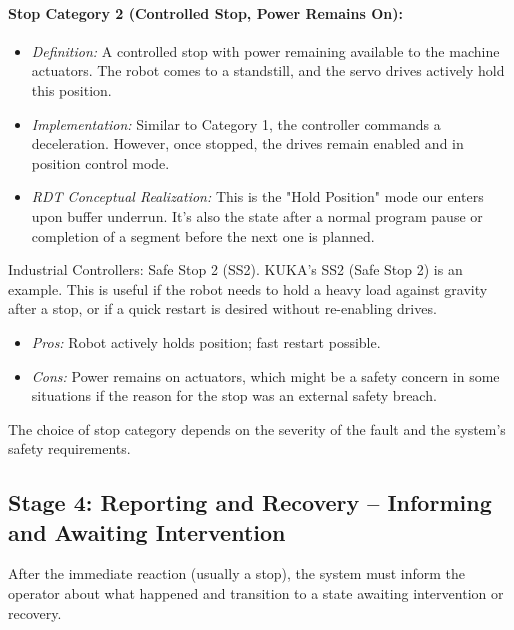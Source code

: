 \paragraph{Stop Category 2 (Controlled Stop, Power Remains On):}
        \begin{itemize}
            \item \textit{Definition:} A controlled stop with power remaining available to the machine actuators. The robot comes to a standstill, and the servo drives actively hold this position.
            \item \textit{Implementation:} Similar to Category 1, the controller commands a deceleration. However, once stopped, the drives remain enabled and in position control mode.
            \item \textit{RDT Conceptual Realization:} This is the "Hold Position" mode our  enters upon buffer underrun. It's also the state after a normal program pause or completion of a segment before the next one is planned.
        \end{itemize}
        \begin{tipbox}{Industrial Controllers: Safe Stop 2 (SS2).}
    KUKA's SS2 (Safe Stop 2) is an example. This is useful if the robot needs to hold a heavy load against gravity after a stop, or if a quick restart is desired without re-enabling drives.
    \begin{itemize}
        \item \textit{Pros:} Robot actively holds position; fast restart possible.
        \item \textit{Cons:} Power remains on actuators, which might be a safety concern in some situations if the reason for the stop was an external safety breach.
    \end{itemize}
    \end{tipbox}

The choice of stop category depends on the severity of the fault and the system's safety requirements.

\subsection{Stage 4: Reporting and Recovery – Informing and Awaiting Intervention}
\label{subsec:reporting_recovery_stage}
After the immediate reaction (usually a stop), the system must inform the operator about what happened and transition to a state awaiting intervention or recovery.

